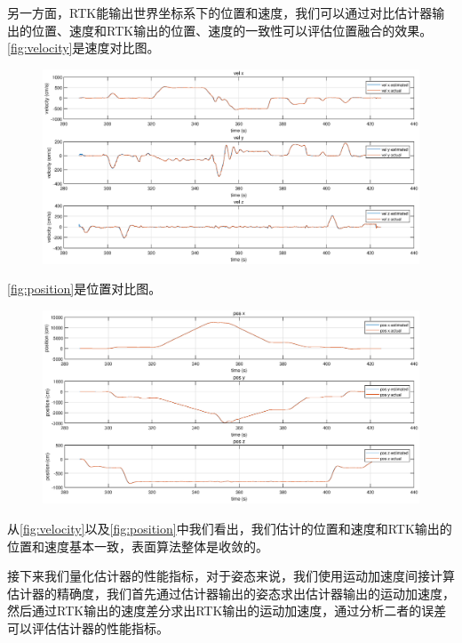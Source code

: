 \documentclass[
  type=master
]{gdutthesis}
\begin{document}
另一方面，RTK能输出世界坐标系下的位置和速度，我们可以通过对比估计器输出的位置、速度和RTK输出的位置、速度的一致性可以评估位置融合的效果。
\autoref{fig:velocity}是速度对比图。
\begin{figure}[htbp]
	\centering
	\includegraphics[width=1.0\textwidth]{velocity.eps}
	\label{fig:velocity}
\end{figure}

\autoref{fig:position}是位置对比图。
\begin{figure}[htbp]
	\centering
	\includegraphics[width=1.0\textwidth]{position.eps}
	\label{fig:position}
\end{figure}
从\autoref{fig:velocity}以及\autoref{fig:position}中我们看出，我们估计的位置和速度和RTK输出的位置和速度基本一致，表面算法整体是收敛的。

接下来我们量化估计器的性能指标，对于姿态来说，我们使用运动加速度间接计算估计器的精确度，我们首先通过估计器输出的姿态求出估计器输出的运动加速度，然后通过RTK输出的速度差分求出RTK输出的运动加速度，通过分析二者的误差可以评估估计器的性能指标。
\end{document}
